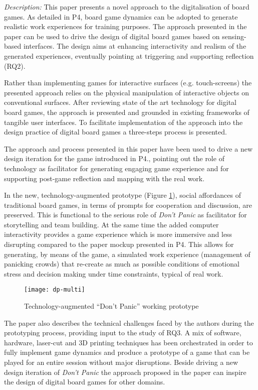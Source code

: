 \emph{Description:} This paper presents a novel approach to the digitalisation of board games. As detailed in P4, board game dynamics can be adopted to generate realistic work experiences for training purposes. The approach presented in the paper can be used to drive the design of digital board games based on sensing-based interfaces. The design aims at enhancing interactivity and realism of the generated experiences, eventually pointing at triggering and supporting reflection (RQ2).

Rather than implementing games for interactive surfaces (e.g. touch-screens) the presented approach relies on the physical manipulation of interactive objects on conventional surfaces. After reviewing state of the art technology for digital board games, the approach is presented and grounded in existing frameworks of tangible user interfaces. To facilitate implementation of the approach into the design practice of digital board games a three-steps process is presented. 

The approach and process presented in this paper have been used to drive a new design iteration for the game introduced in P4., pointing out the role of technology as facilitator for generating engaging game experience and for supporting post-game reflection and mapping with the real work. 

In the new, technology-augmented prototype (Figure \ref{fig:dp-token}), social affordances of traditional board games, in terms of prompts for cooperation and discussion, are preserved. This is functional to the serious role of \emph{Don't Panic} as facilitator for storytelling and team building. At the same time the added computer interactivity provides a game experience which is more immersive and less disrupting compared to the paper mockup presented in P4. This allows for generating, by means of the game, a simulated work experience (management of panicking crowds) that re-create as much as possible conditions of emotional stress and decision making under time constraints, typical of real work. 

\begin{figure}
	[tbh] \centering 
	\texttt{[image: dp-multi]} \caption{Technology-augmented “Don't Panic” working prototype} \label{fig:dp-token} 
\end{figure}

The paper also describes the technical challenges faced by the authors during the prototyping process, providing input to the study of RQ3. A mix of software, hardware, laser-cut and 3D printing techniques has been orchestrated in order to fully implement game dynamics and produce a prototype of a game that can be played for an entire session without major disruptions. Beside driving a new design iteration of \emph{Don't Panic} the approach proposed in the paper can inspire the design of digital board games for other domains.

